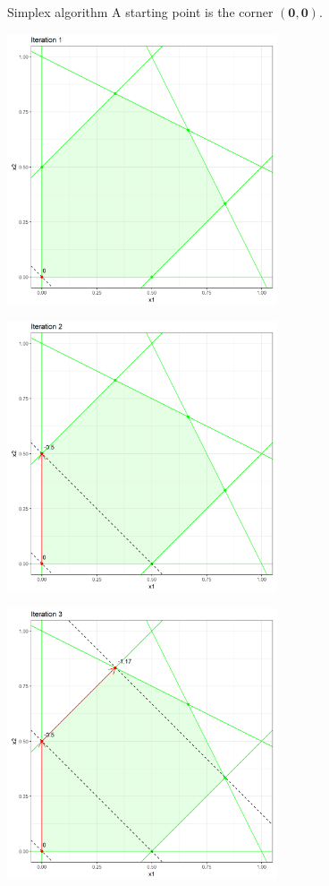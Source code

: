 \begin{vbframe}{Simplex algorithm}
A starting point is the corner $\bm{(0, 0)}$.

\framebreak

\begin{center}
\includegraphics[width = 0.6\textwidth]{figure_man/simplex_implementation/iter1.png}
\end{center}

\framebreak

\begin{center}
\includegraphics[width = 0.6\textwidth]{figure_man/simplex_implementation/iter2.png}
\end{center}

\framebreak

\begin{center}
\includegraphics[width = 0.6\textwidth]{figure_man/simplex_implementation/iter3.png}
\end{center}


\end{vbframe}
